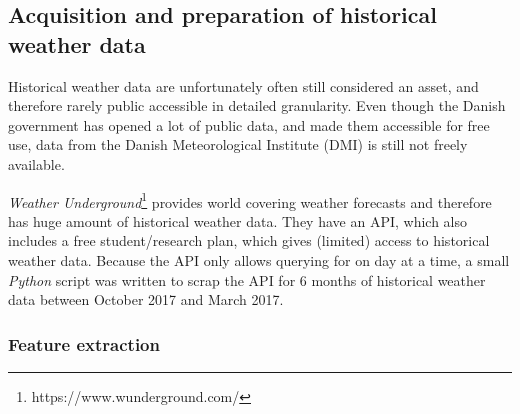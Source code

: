 
\subsection{Acquisition and preparation of historical weather data}
\label{appx:weather_data_prep}

Historical weather data are unfortunately often still considered an asset, and therefore rarely public accessible in detailed granularity. Even though the Danish government has opened a lot of public data, and made them accessible for free use, data from the Danish Meteorological Institute (DMI) is still not freely available.

\emph{Weather Underground}\footnote{https://www.wunderground.com/} provides world covering weather forecasts and therefore has huge amount of historical weather data. They have an API, which also includes a free student/research plan, which gives (limited) access to historical weather data. Because the API only allows querying for on day at a time, a small \emph{Python} script was written to scrap the API for 6 months of historical weather data between October 2017 and March 2017.

\subsubsection{Feature extraction}